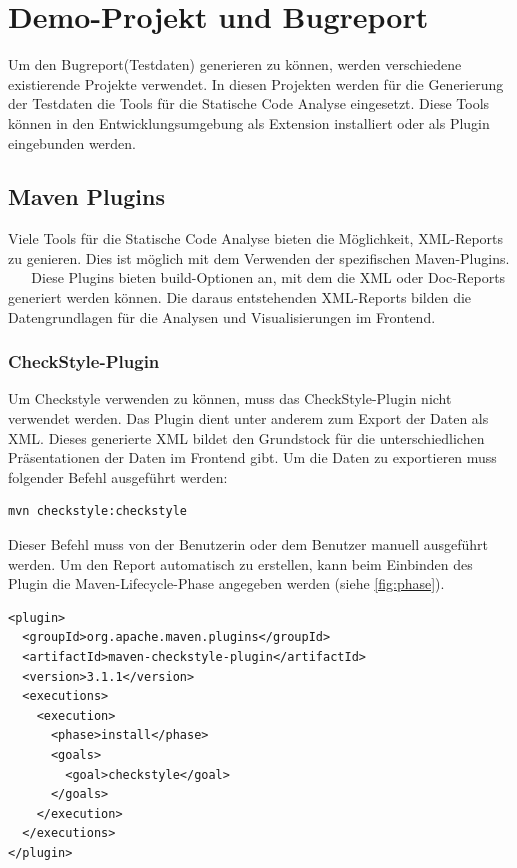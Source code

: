 \section{Demo-Projekt und Bugreport}
Um den Bugreport(Testdaten) generieren zu können, werden verschiedene existierende Projekte verwendet. In diesen Projekten werden für die Generierung der Testdaten die Tools für die Statische Code Analyse eingesetzt. Diese Tools können in den Entwicklungsumgebung als Extension installiert oder als Plugin eingebunden werden.
\subsection{Maven Plugins}
Viele Tools für die Statische Code Analyse bieten die Möglichkeit, XML-Reports zu genieren. Dies ist möglich mit dem Verwenden der spezifischen Maven-Plugins. ~\parencite{spotBugsUsage} ~\parencite{checkstylePlugin} 
Diese Plugins bieten build-Optionen an, mit dem die XML oder Doc-Reports generiert werden können. Die daraus entstehenden XML-Reports bilden die Datengrundlagen für die Analysen und Visualisierungen im Frontend.
\subsubsection{CheckStyle-Plugin}
Um Checkstyle verwenden zu können, muss das CheckStyle-Plugin nicht verwendet werden. Das Plugin dient unter anderem zum Export der Daten als XML. Dieses generierte XML bildet den Grundstock für die unterschiedlichen Präsentationen der Daten im Frontend gibt. Um die Daten zu exportieren muss folgender Befehl ausgeführt werden:
\begin{verbatim}
mvn checkstyle:checkstyle
\end{verbatim}
Dieser Befehl muss von der Benutzerin oder dem Benutzer manuell ausgeführt werden. Um den Report automatisch zu erstellen, kann beim Einbinden des Plugin die Maven-Lifecycle-Phase angegeben werden (siehe \ref{fig:phase}).

\lstset{
  caption={Das Plugin wird automatisch in der install-Phase ausgeführt.}, 
  basicstyle=\small\ttfamily, 
  label=lst:phase, 
  language=Java,
  frame=single,
  breaklines=true, %
  postbreak=\mbox{\textcolor{red}{$\hookrightarrow$}\space},
}

\begin{samepage}%
	\begin{lstlisting}[float=tbhp]
<plugin>
  <groupId>org.apache.maven.plugins</groupId>
  <artifactId>maven-checkstyle-plugin</artifactId>
  <version>3.1.1</version>
  <executions>
    <execution>
      <phase>install</phase>
      <goals>
        <goal>checkstyle</goal>
      </goals>
    </execution>
  </executions>
</plugin>
	\end{lstlisting}
\end{samepage}
